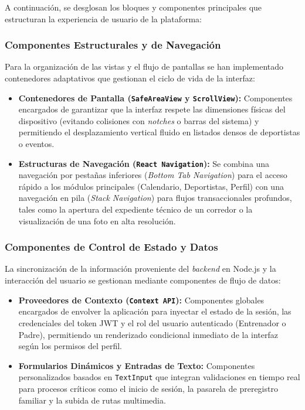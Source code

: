         A continuación, se desglosan los bloques y componentes principales que estructuran la experiencia de usuario de la plataforma:

        \subsubsection{Componentes Estructurales y de Navegación}
        Para la organización de las vistas y el flujo de pantallas se han implementado contenedores adaptativos que gestionan el ciclo de vida de la interfaz:
        \begin{itemize}
            \item \textbf{Contenedores de Pantalla (\texttt{SafeAreaView} y \texttt{ScrollView}):} Componentes encargados de garantizar que la interfaz respete las dimensiones físicas del dispositivo (evitando colisiones con \textit{notches} o barras del sistema) y permitiendo el desplazamiento vertical fluido en listados densos de deportistas o eventos.
            \item \textbf{Estructuras de Navegación (\texttt{React Navigation}):} Se combina una navegación por pestañas inferiores (\textit{Bottom Tab Navigation}) para el acceso rápido a los módulos principales (Calendario, Deportistas, Perfil) con una navegación en pila (\textit{Stack Navigation}) para flujos transaccionales profundos, tales como la apertura del expediente técnico de un corredor o la visualización de una foto en alta resolución.
        \end{itemize}

        \subsubsection{Componentes de Control de Estado y Datos}
        La sincronización de la información proveniente del \textit{backend} en Node.js y la interacción del usuario se gestionan mediante componentes de flujo de datos:
        \begin{itemize}
            \item \textbf{Proveedores de Contexto (\texttt{Context API}):} Componentes globales encargados de envolver la aplicación para inyectar el estado de la sesión, las credenciales del token JWT y el rol del usuario autenticado (Entrenador o Padre), permitiendo un renderizado condicional inmediato de la interfaz según los permisos del perfil.
            \item \textbf{Formularios Dinámicos y Entradas de Texto:} Componentes personalizados basados en \texttt{TextInput} que integran validaciones en tiempo real para procesos críticos como el inicio de sesión, la pasarela de preregistro familiar y la subida de rutas multimedia.
        \end{itemize}

